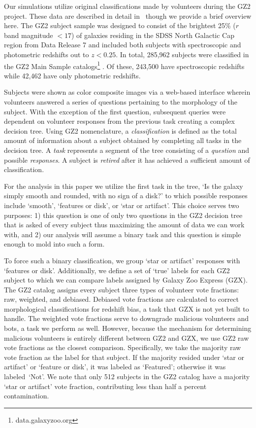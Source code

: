 \documentclass[twocolumn]{aastex6}
\newcommand{\feat}{`Featured'}
\newcommand{\notfeat}{`Not'}
\begin{document}
Our simulations utilize original classifications made by volunteers during the GZ2 project. 
These data are described in detail in~\cite{Willett2013} though we provide a brief overview here.  
The GZ2 subject sample was designed to consist of the brightest 25\% ($r$ band magnitude $< 17$) 
of galaxies residing in the SDSS North Galactic Cap region from Data Release 7 
and included both subjects with spectroscopic and photometric redshifts out to $z < 0.25$.
In total, 285,962 subjects were classified in the GZ2 Main Sample 
catalogs\footnote{data.galaxyzoo.org} . 
Of these, 243,500 have spectroscopic redshifts while 42,462 have only photometric redshifts.  

Subjects were shown as color composite images via a web-based interface wherein 
volunteers answered a series of questions pertaining to the morphology of the subject.
With the exception of the first question, subsequent queries were 
dependent on volunteer responses from the previous task creating a complex decision tree. 
Using GZ2 nomenclature,  a \textit{classification} is defined as the total amount of
information about a subject obtained by completing all tasks in the decision tree. 
A \textit{task} represents a segment of the
tree consisting of a \textit{question} and possible \textit{responses}. 
A subject is \textit{retired} after it has achieved a sufficient amount of classification.


For the analysis in this paper we utilize the first task in the tree, 
`Is the galaxy simply smooth and rounded, with no sign of a disk?' to which possible 
responses include `smooth', `features or disk', or `star or artifact'. This choice
serves two purposes: 1) this question is one of only two questions in the GZ2
decision tree that is asked of every subject thus maximizing the amount of data
we can work with, and 2) our analysis will assume a 
binary task and this question is simple enough to mold into such a form. 

To force such a binary classification, we group `star or artifact' responses with `features or disk'. 
Additionally, we define a set of `true' labels for each GZ2 subject to which
we can compare labels assigned by Galaxy Zoo Express (GZX).  
The GZ2 catalog assigns every subject three types of volunteer vote fractions: 
raw, weighted, and debiased. 
Debiased vote fractions are calculated to correct morphological classifications
for redshift bias, a task that GZX is not yet built to handle. 
The weighted vote fractions serve to downgrade malicious volunteers and bots, 
a task we perform as well. However, because the mechanism for
determining malicious volunteers is entirely different between GZ2 and GZX, 
we use GZ2 raw vote fractions as the closest comparison. 
Specifically, we take the majority raw vote fraction as the label for that subject. If the 
majority resided under `star or artifact' or `feature or disk', it was labeled as \feat; 
otherwise it was labeled~\notfeat. We note that only 512 subjects in the GZ2 
catalog have a majority `star or artifact' vote 
fraction, contributing less than half a percent contamination. 
\end{document}
